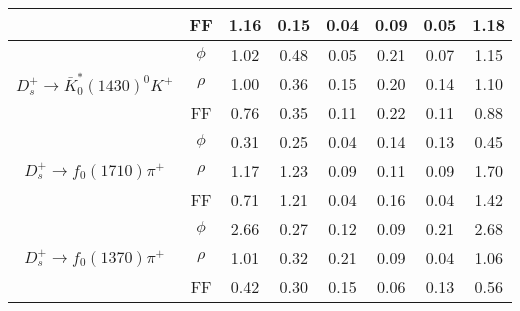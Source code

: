 {\begin{table}[tp]
\begin{tabular}{cccccccc}
                                                                                        & FF            &1.16      &0.15       &0.04   &0.09  &0.05  &1.18 \\
            \hline                                                                                                                                         
            \multirow{3}{*}{$D_{s}^{+} \rightarrow \bar{K}^{*}_{0}(1430)^{0}K^{+}$}     & $\phi$        &1.02      &0.48       &0.05   &0.21  &0.07  &1.15     \\
                                                                                        & $\rho$        &1.00      &0.36       &0.15   &0.20  &0.14  &1.10 \\
                                                                                        & FF            &0.76      &0.35       &0.11   &0.22  &0.11  &0.88 \\
            \hline                                                                                                                                         
            \multirow{3}{*}{$D_{s}^{+} \rightarrow f_{0}(1710)\pi^{+}$}                 & $\phi$        &0.31      &0.25       &0.04   &0.14  &0.13  &0.45 \\
                                                                                        & $\rho$        &1.17      &1.23       &0.09   &0.11  &0.09  &1.70 \\
                                                                                        & FF            &0.71      &1.21       &0.04   &0.16  &0.04  &1.42 \\
            \hline                                                                                                                                         
            \multirow{3}{*}{$D_{s}^{+} \rightarrow f_{0}(1370)\pi^{+}$}                 & $\phi$        &2.66      &0.27       &0.12   &0.09  &0.21  &2.68  \\
                                                                                        & $\rho$        &1.01      &0.32       &0.21   &0.09  &0.04  &1.06 \\
                                                                                        & FF            &0.42      &0.30       &0.15   &0.06  &0.13  &0.56 \\
            \bottomrule\bottomrule
        \end{tabular}  
    \end{table}  

}

